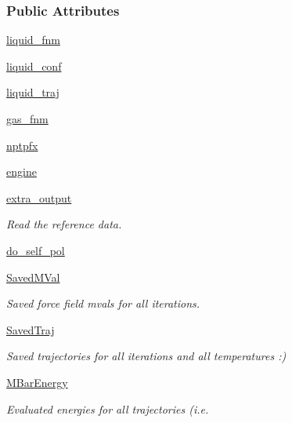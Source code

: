 \subsubsection*{\-Public \-Attributes}
\begin{DoxyCompactItemize}
\item 
\hyperlink{classforcebalance_1_1gmxio_1_1Liquid__GMX_af5708dd59b9a2e5a4ebe8d7a2ef733a4}{liquid\-\_\-fnm}
\item 
\hyperlink{classforcebalance_1_1gmxio_1_1Liquid__GMX_accf2821929c2d30be61e01f451ca94f7}{liquid\-\_\-conf}
\item 
\hyperlink{classforcebalance_1_1gmxio_1_1Liquid__GMX_ad4af4c90e056152c0db86d7a1aa4b7d1}{liquid\-\_\-traj}
\item 
\hyperlink{classforcebalance_1_1gmxio_1_1Liquid__GMX_a842626824afb5f2125a0261c1f3cda35}{gas\-\_\-fnm}
\item 
\hyperlink{classforcebalance_1_1gmxio_1_1Liquid__GMX_a84305eed5ebac35c2148887af830a8d4}{nptpfx}
\item 
\hyperlink{classforcebalance_1_1gmxio_1_1Liquid__GMX_a7b1765768b1c3e71ec1e3be1bea3d8dd}{engine}
\item 
\hyperlink{classforcebalance_1_1gmxio_1_1Liquid__GMX_ac9f30f5bafc9355de1694e3e2e7e8871}{extra\-\_\-output}
\begin{DoxyCompactList}\small\item\em \-Read the reference data. \end{DoxyCompactList}\item 
\hyperlink{classforcebalance_1_1liquid_1_1Liquid_af7ba85e825dfe42a384c2eb2e7cc1f0c}{do\-\_\-self\-\_\-pol}
\item 
\hyperlink{classforcebalance_1_1liquid_1_1Liquid_a110998789cb046248b78318c97872930}{\-Saved\-M\-Val}
\begin{DoxyCompactList}\small\item\em \-Saved force field mvals for all iterations. \end{DoxyCompactList}\item 
\hyperlink{classforcebalance_1_1liquid_1_1Liquid_acab3a497d408af6d152a460ecba40583}{\-Saved\-Traj}
\begin{DoxyCompactList}\small\item\em \-Saved trajectories for all iterations and all temperatures \-:) \end{DoxyCompactList}\item 
\hyperlink{classforcebalance_1_1liquid_1_1Liquid_a92ec9101fdcdadf9c9a3975bac0b409e}{\-M\-Bar\-Energy}
\begin{DoxyCompactList}\small\item\em \-Evaluated energies for all trajectories (i.\-e. \end{DoxyCompactList}\item 

\end{DoxyCompactItemize}
